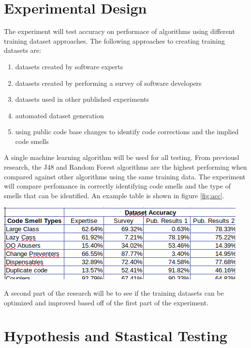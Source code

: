 \documentclass[conference]{IEEEtran}
\begin{document}
\section{Experimental Design}
The experiment will test accuracy on performace of algorithms using different training dataset approaches.
The following approaches to creating training datasets are: 
\begin{enumerate}
\item datasets created by software experts
\item datasets created by performing a survey of software developers 
\item datasets used in other published experiments
\item automated dataset generation
\item using public code base changes to identify code corrections and the implied code smells
\end{enumerate}
A single machine learning algorithm will be used for all testing. 
From previousl research\cite{arcelli_fontana_comparing_2016}, the J48 and Random Forest algorithms are the highest performing when compared against other algorithms using the same training data.
The experiment will compare perfomance in correctly identifying code smells and the type of smells that can be identified. 
An example table is shown in figure \ref{fig:acc}.

\begin{center}
\includegraphics[width=\columnwidth]{performance.png}
\label{fig:acc}%
\end{center}

A second part of the research will be to see if the training datasets can be optimized and improved based off of the first part of the experiment.

\section{Hypothesis and Stastical Testing}
\end{document}
